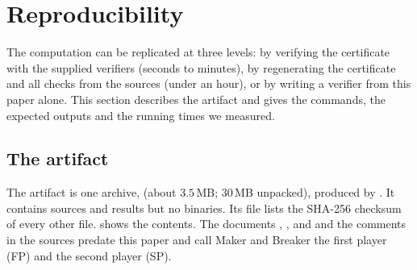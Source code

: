 \section{Reproducibility}\label{sec:repro}


The computation can be replicated at three levels: by verifying the certificate with the supplied
verifiers (seconds to minutes), by regenerating the certificate and all checks from the sources (under an
hour), or by writing a verifier from this paper alone. This section describes the artifact and gives the
commands, the expected outputs and the running times we measured.

\subsection{The artifact}\label{ssec:artifact}

The artifact is one archive,  (about $3.5$\,MB; $30$\,MB unpacked), produced by
. It contains sources and results but no binaries. Its file
 lists the SHA-256 checksum of every other file.  shows the
contents. The documents , ,  and  and the comments in the
sources predate this paper and call Maker and Breaker the first player (FP) and the second player (SP).


